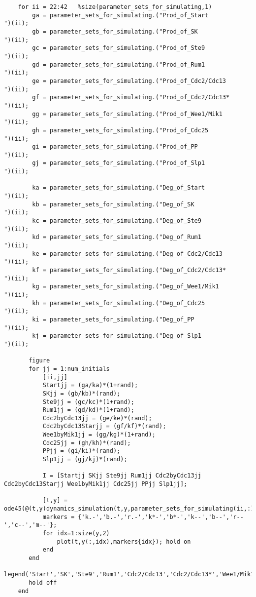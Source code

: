 \documentclass{article}
\begin{document}
\begin{verbatim}
    for ii = 22:42   %size(parameter_sets_for_simulating,1)
        ga = parameter_sets_for_simulating.("Prod_of_Start                ")(ii);
        gb = parameter_sets_for_simulating.("Prod_of_SK                   ")(ii);
        gc = parameter_sets_for_simulating.("Prod_of_Ste9                 ")(ii);
        gd = parameter_sets_for_simulating.("Prod_of_Rum1                 ")(ii);
        ge = parameter_sets_for_simulating.("Prod_of_Cdc2/Cdc13           ")(ii);
        gf = parameter_sets_for_simulating.("Prod_of_Cdc2/Cdc13*          ")(ii);
        gg = parameter_sets_for_simulating.("Prod_of_Wee1/Mik1            ")(ii);
        gh = parameter_sets_for_simulating.("Prod_of_Cdc25                ")(ii);
        gi = parameter_sets_for_simulating.("Prod_of_PP                   ")(ii);
        gj = parameter_sets_for_simulating.("Prod_of_Slp1                 ")(ii);
        
        ka = parameter_sets_for_simulating.("Deg_of_Start                 ")(ii);
        kb = parameter_sets_for_simulating.("Deg_of_SK                    ")(ii);
        kc = parameter_sets_for_simulating.("Deg_of_Ste9                  ")(ii);
        kd = parameter_sets_for_simulating.("Deg_of_Rum1                  ")(ii);
        ke = parameter_sets_for_simulating.("Deg_of_Cdc2/Cdc13            ")(ii);
        kf = parameter_sets_for_simulating.("Deg_of_Cdc2/Cdc13*           ")(ii);
        kg = parameter_sets_for_simulating.("Deg_of_Wee1/Mik1             ")(ii);
        kh = parameter_sets_for_simulating.("Deg_of_Cdc25                 ")(ii);
        ki = parameter_sets_for_simulating.("Deg_of_PP                    ")(ii);
        kj = parameter_sets_for_simulating.("Deg_of_Slp1                  ")(ii);
        
       figure
       for jj = 1:num_initials
           [ii,jj]
           Startjj = (ga/ka)*(1+rand);
           SKjj = (gb/kb)*(rand);
           Ste9jj = (gc/kc)*(1+rand);
           Rum1jj = (gd/kd)*(1+rand);
           Cdc2byCdc13jj = (ge/ke)*(rand);
           Cdc2byCdc13Starjj = (gf/kf)*(rand);
           Wee1byMik1jj = (gg/kg)*(1+rand);
           Cdc25jj = (gh/kh)*(rand);
           PPjj = (gi/ki)*(rand);
           Slp1jj = (gj/kj)*(rand);
    
           I = [Startjj SKjj Ste9jj Rum1jj Cdc2byCdc13jj Cdc2byCdc13Starjj Wee1byMik1jj Cdc25jj PPjj Slp1jj];
    
           [t,y] = ode45(@(t,y)dynamics_simulation(t,y,parameter_sets_for_simulating(ii,:)),run_time,I);
           markers = {'k.-','b.-','r.-','k*-','b*-','k--','b--','r--','c--','m--'};
           for idx=1:size(y,2)
               plot(t,y(:,idx),markers{idx}); hold on
           end
       end
       legend('Start','SK','Ste9','Rum1','Cdc2/Cdc13','Cdc2/Cdc13*','Wee1/Mik1','Cdc25','PP','Slp1');
       hold off
    end
    
    
    
\end{verbatim}
\end{document}
